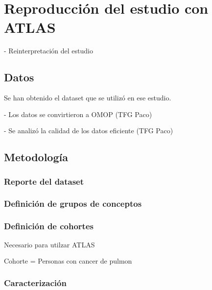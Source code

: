 \section{Reproducción del estudio con ATLAS} \label{sec:08atlas}


- Reinterpretación del estudio

\subsection{Datos}


Se han obtenido el dataset que se utilizó en ese estudio.

- Los datos se convirtieron a OMOP (TFG Paco)

- Se analizó la calidad de los datos eficiente (TFG Paco)

\subsection{Metodología}


\subsubsection{Reporte del dataset}

\subsubsection{Definición de grupos de conceptos}

\subsubsection{Definición de cohortes}

Necesario para utilzar ATLAS

Cohorte = Personas con cancer de pulmon

\subsubsection{Caracterización}

